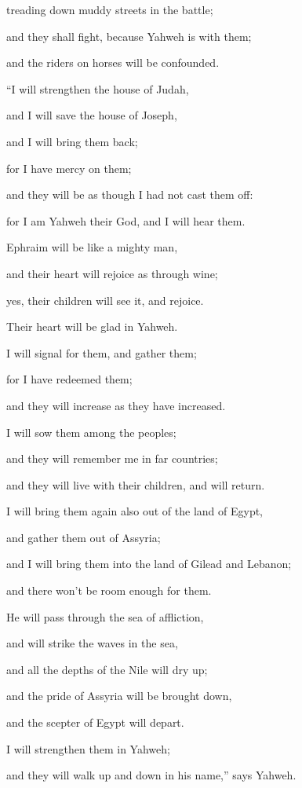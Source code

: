 {\par }{\QB treading down muddy streets in the battle;
\par }{\QB and they shall fight, because Yahweh is with them;
\par }{\QB and the riders on horses will be confounded.
\par }{\Q {}“I will strengthen the house of Judah,
\par }{\QB and I will save the house of Joseph,
\par }{\QB and I will bring them back;
\par }{\QB for I have mercy on them;
\par }{\QB and they will be as though I had not cast them off:
\par }{\QB for I am Yahweh their God, and I will hear them.
\par }{\Q {}Ephraim will be like a mighty man,
\par }{\QB and their heart will rejoice as through wine;
\par }{\QB yes, their children will see it, and rejoice.
\par }{\QB Their heart will be glad in Yahweh.
\par }{\Q {}I will signal for them, and gather them;
\par }{\QB for I have redeemed them;
\par }{\QB and they will increase as they have increased.
\par }{\Q {}I will sow them among the peoples;
\par }{\QB and they will remember me in far countries;
\par }{\QB and they will live with their children, and will return.
\par }{\Q {}I will bring them again also out of the land of Egypt,
\par }{\QB and gather them out of Assyria;
\par }{\Q and I will bring them into the land of Gilead and Lebanon;
\par }{\QB and there won’t be room enough for them.
\par }{\Q {}He will pass through the sea of affliction,
\par }{\QB and will strike the waves in the sea,
\par }{\QB and all the depths of the Nile will dry up;
\par }{\QB and the pride of Assyria will be brought down,
\par }{\QB and the scepter of Egypt will depart.
\par }{\Q {}I will strengthen them in Yahweh;
\par }{\QB and they will walk up and down in his name,” says Yahweh.

}
